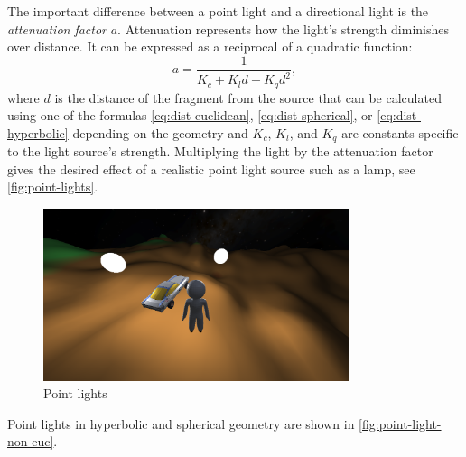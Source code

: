 The important difference between a point light and a directional light is the \textit{attenuation factor} $a$.
Attenuation represents how the light's strength diminishes over distance.
It can be expressed as a reciprocal of a quadratic function:
\begin{equation}
    a = \frac{1}{K_c + K_l d + K_q d^2},
\end{equation}
where $d$ is the distance of the fragment from the source that can be calculated using one of the formulas \ref{eq:dist-euclidean}, \ref{eq:dist-spherical}, or \ref{eq:dist-hyperbolic} depending on the geometry and $K_c$, $K_l$, and $K_q$ are constants specific to the light source's strength.
Multiplying the light by the attenuation factor gives the desired effect of a realistic point light source such as a lamp, see \autoref{fig:point-lights}.
\begin{figure}[!htb]
    \centering
    \includegraphics[width=0.8\textwidth]{chapters/theoretical_foundations/sections/lighting/resources/point-lights.png}
    \caption{Point lights}
    \label{fig:point-lights}
\end{figure}
Point lights in hyperbolic and spherical geometry are shown in \autoref{fig:point-light-non-euc}.
